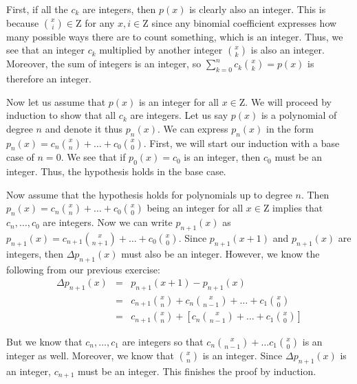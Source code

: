 \documentclass[psamsfonts]{amsart}
\newenvironment{sol}{{\bfseries Solution}}{\qedsymbol}
\theoremstyle{definition}
\theoremstyle{remark}
\numberwithin{equation}{section}
\begin{document}
\begin{sol}
First, if all the $c_k$ are integers, then $p(x)$ is clearly also an integer. This is because ${x \choose i} \in \mathrm{Z}$ for any $x, i \in \mathrm{Z}$ since any binomial coefficient expresses how many possible ways there are to count something, which is an integer. Thus, we see that an integer $c_k$ multiplied by another integer ${x \choose k}$ is also an integer. Moreover, the sum of integers is an integer, so $\sum_{k=0}^n c_k {x \choose k} = p(x)$ is therefore an integer.

Now let us assume that $p(x)$ is an integer for all $x \in \mathrm{Z}$. We will proceed by induction to show that all $c_k$ are integers. Let us say $p(x)$ is a polynomial of degree $n$ and denote it thus $p_n(x)$. We can express $p_n(x)$ in the form $p_n(x) = c_n {x \choose n} + \ldots + c_0 {x \choose 0}$. First, we will start our induction with a base case of $n = 0$. We see that if $p_0(x) = c_0$ is an integer, then $c_0$ must be an integer. Thus, the hypothesis holds in the base case. 

Now assume that the hypothesis holds for polynomials up to degree $n$. Then $p_{n}(x) = c_n {x \choose n} + \ldots + c_0 {x \choose 0}$ being an integer for all $x \in \mathrm{Z}$ implies that $c_n, \ldots, c_0$ are integers. Now we can write $p_{n+1}(x)$ as $p_{n+1}(x) = c_{n+1} {x \choose n + 1} + \ldots + c_{0} {x \choose 0}$. Since $p_{n+1}(x+1)$ and $p_{n+1}(x)$ are integers, then $\Delta p_{n+1}(x)$ must also be an integer. However, we know the following from our previous exercise:
\begin{eqnarray}
\Delta p_{n+1}(x) &=& p_{n+1}(x+1) - p_{n+1}(x) \\
&=& c_{n+1} {x \choose n } + c_{n} {x \choose n - 1} + \ldots + c_{1} {x \choose 0} \\
&=& c_{n+1} {x \choose n} + \left[ c_{n} {x \choose n - 1} + \ldots + c_{1} {x \choose 0} \right]
\end{eqnarray}

But we know that $c_n, \ldots, c_1$ are integers so that $c_n {x \choose n- 1} + \ldots c_1 {x \choose 0}$ is an integer as well. Moreover, we know that ${x \choose n}$ is an integer. Since $\Delta p_{n+1}(x)$ is an integer, $c_{n+1}$ must be an integer. This finishes the proof by induction.

 
\end{sol}
\end{document}
